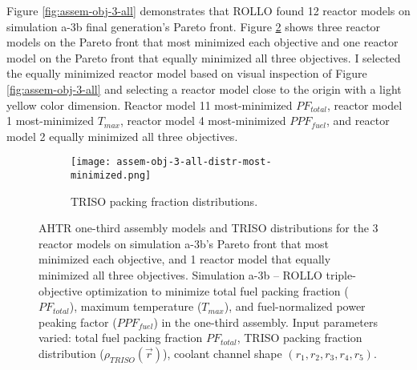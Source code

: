 Figure \ref{fig:assem-obj-3-all} demonstrates that \gls{ROLLO} found 12 reactor models 
on simulation a-3b final generation's Pareto front. 
Figure \ref{fig:assem-obj-3-all-most-minimized} shows three reactor models on the 
Pareto front that most minimized each objective and one reactor model on the 
Pareto front that equally minimized all three objectives. 
I selected the equally minimized reactor model based on visual inspection of Figure 
\ref{fig:assem-obj-3-all} and selecting a reactor model close to the origin 
with a light yellow color dimension. 
Reactor model 11 most-minimized $PF_{total}$, reactor model 1 most-minimized $T_{max}$, 
reactor model 4 most-minimized $PPF_{fuel}$, and reactor model 2 equally minimized 
all three objectives. 
\begin{figure}[htbp!]
    \centering
    \begin{subfigure}{\textwidth}
    \centering
    \texttt{[image: assem-obj-3-all-distr-most-minimized.png]}
    \caption{TRISO packing fraction distributions.}
    \label{fig:assem-obj-3-all-most-minimized-distr}
    \end{subfigure}
    \caption{AHTR one-third assembly models and TRISO distributions for the 3 reactor 
    models on simulation a-3b's Pareto front that most minimized each objective, and 
    1 reactor model that equally minimized all three objectives.
    Simulation a-3b -- ROLLO triple-objective optimization to minimize 
    total fuel packing fraction ($PF_{total}$), maximum temperature ($T_{max}$), 
    and fuel-normalized power peaking factor ($PPF_{fuel}$) in the one-third assembly. 
    Input parameters varied: total fuel packing fraction $PF_{total}$, 
    TRISO packing fraction distribution ($\rho_{TRISO}(\vec{r})$), 
    coolant channel shape $(r_1, r_2, r_3, r_4, r_5)$.}
    \label{fig:assem-obj-3-all-most-minimized}
\end{figure}

